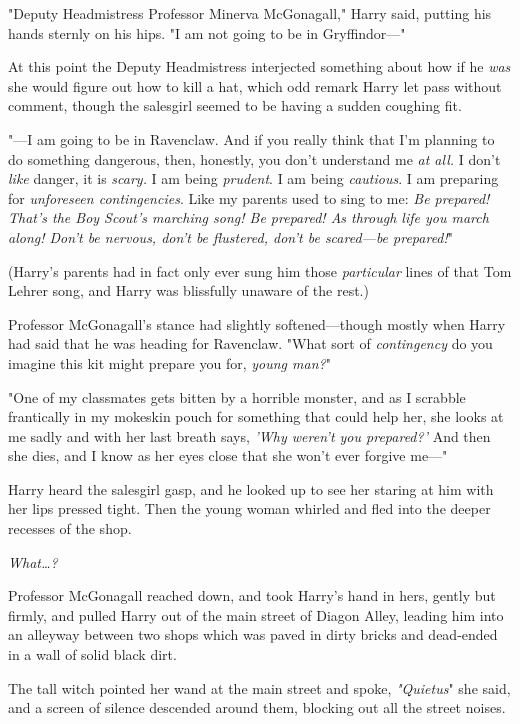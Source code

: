 "Deputy Headmistress Professor Minerva McGonagall," Harry said, putting his 
hands sternly on his hips. "I am not going to be in Gryffindor---"

At this point the Deputy Headmistress interjected something about how if he 
\emph{was} she would figure out how to kill a hat, which odd remark Harry let 
pass without comment, though the salesgirl seemed to be having a sudden 
coughing fit.

"---I am going to be in Ravenclaw. And if you really think that I'm planning to 
do something dangerous, then, honestly, you don't understand me \emph{at all.} 
I don't \emph{like} danger, it is \emph{scary.} I am being \emph{prudent}. I am 
being \emph{cautious}. I am preparing for \emph{unforeseen contingencies}. Like 
my parents used to sing to me: \emph{Be prepared! That's the Boy Scout's 
marching song! Be prepared! As through life you march along! Don't be nervous, 
don't be flustered, don't be scared---be prepared!}"

(Harry's parents had in fact only ever sung him those \emph{particular} lines 
of that Tom Lehrer song, and Harry was blissfully unaware of the rest.)

Professor McGonagall's stance had slightly softened---though mostly when Harry 
had said that he was heading for Ravenclaw. "What sort of \emph{contingency} do 
you imagine this kit might prepare you for, \emph{young man?}"

"One of my classmates gets bitten by a horrible monster, and as I scrabble 
frantically in my mokeskin pouch for something that could help her, she looks 
at me sadly and with her last breath says, \emph{'Why weren't you prepared?'} 
And then she dies, and I know as her eyes close that she won't ever forgive 
me---"

Harry heard the salesgirl gasp, and he looked up to see her staring at him with 
her lips pressed tight. Then the young woman whirled and fled into the deeper 
recesses of the shop.

\emph{What{\ldots}?}

Professor McGonagall reached down, and took Harry's hand in hers, gently but 
firmly, and pulled Harry out of the main street of Diagon Alley, leading him 
into an alleyway between two shops which was paved in dirty bricks and 
dead-ended in a wall of solid black dirt.

The tall witch pointed her wand at the main street and spoke, \emph{"Quietus}" 
she said, and a screen of silence descended around them, blocking out all the 
street noises.


